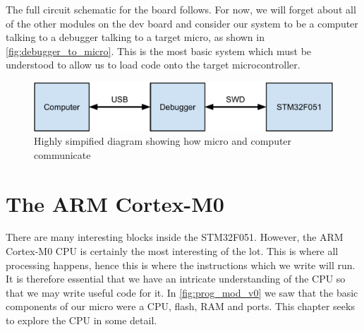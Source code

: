 The full circuit schematic for the board follows. 
For now, we will forget about all of the other modules on the dev board and consider our system to be a computer talking to a debugger talking to a target micro, as shown in \autoref{fig:debugger_to_micro}. 
This is the most basic system which must be understood to allow us to load code onto the target microcontroller.

\begin{figure}[t]
  \includegraphics[width=\textwidth]{./week1/debugger_to_micro.pdf}
  \caption{Highly simpified diagram showing how micro and computer communicate}
  \label{fig:debugger_to_micro}
\end{figure}

\afterpage{
  \begin{landscape}
    \centering
    
 \end{landscape}
} 




\chapter{The ARM Cortex-M0}

There are many interesting blocks inside the STM32F051. However, the ARM Cortex-M0 CPU is certainly the most interesting of the lot. This is where all processing happens, hence this is where the instructions which we write will run. It is therefore essential that we have an intricate understanding of the CPU so that we may write useful code for it.
In \autoref{fig:prog_mod_v0} we saw that the basic components of our micro were a CPU, flash, RAM and ports. This chapter seeks to explore the CPU in some detail.


